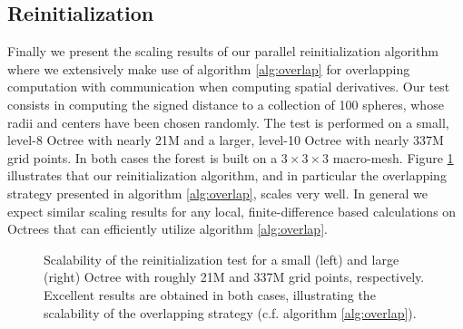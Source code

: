 \subsection{Reinitialization} \label{section::scaling_reinitialization}

Finally we present the scaling results of our parallel reinitialization algorithm where we extensively make use of algorithm \ref{alg:overlap} for overlapping computation with communication when computing spatial derivatives. Our test consists in computing the signed distance to a collection of 100 spheres, whose radii and centers have been chosen randomly. The test is performed on a small, level-8 Octree with nearly 21M and a larger, level-10 Octree with nearly 337M grid points. In both cases the forest is built on a $3\times3\times3$ macro-mesh. Figure \ref{fig:reinit} illustrates that our reinitialization algorithm, and in particular the overlapping strategy presented in algorithm \ref{alg:overlap}, scales very well. In general we expect similar scaling results for any local, finite-difference based calculations on Octrees that can efficiently utilize algorithm \ref{alg:overlap}. 
\begin{figure}
\centering
{}
\caption{Scalability of the reinitialization test for a small (left) and large (right) Octree with roughly 21M and 337M grid points, respectively. Excellent results are obtained in both cases, illustrating the scalability of the overlapping strategy (c.f. algorithm \ref{alg:overlap}).}
\label{fig:reinit}
\end{figure}
